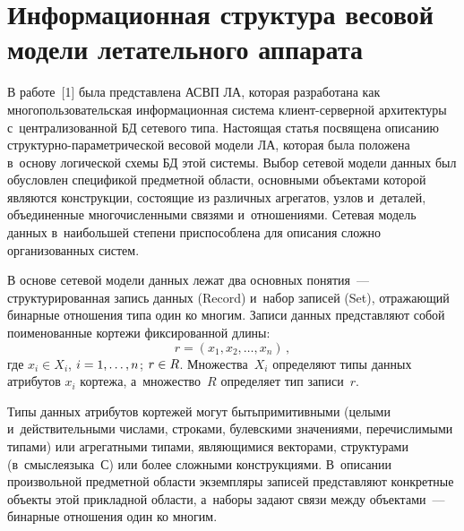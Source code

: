 \begin{multicols}{2}

\label{st\stat}

\section{Информационная структура весовой модели летательного 
аппарата}

  В работе~[1] была представлена АСВП ЛА, которая разработана как 
многопользовательская информационная система кли\-ент-сер\-вер\-ной 
архитектуры с~централизованной БД сетевого типа. \mbox{Настоящая} 
статья посвящена описанию струк\-тур\-но-па\-ра\-мет\-ри\-че\-ской весовой 
модели ЛА, которая была положена в~основу логической 
схемы БД этой сис\-те\-мы. Выбор сетевой модели данных был 
обуслов\-лен спецификой предметной об\-ласти, основными объектами которой 
являются конструкции, состоящие из различных агрегатов, узлов и~деталей, 
объединенные многочисленными связями и~отношениями. Сетевая модель 
данных в~наибольшей степени приспособлена для описания слож\-но 
организованных сис\-тем. 
  
  В основе сетевой модели данных лежат два основных понятия~--- 
структурированная запись данных (Record) и~набор записей (Set), отра\-жа\-ющий 
бинарные отношения типа один ко многим. Записи данных представляют собой 
поименованные кортежи фиксированной длины:
  $$
  r=\left( x_1, x_2,\ldots , x_n\right)\,,
  $$
  где $x_i\in X_i$, $i\hm=1,\ldots , n$; $r\hm\in R$.
  Множества~$X_i$ определяют типы данных атрибутов $x_i$ кортежа, 
а~множество~$R$ определяет тип записи~$r$. 

Типы данных атрибутов кортежей 
могут быть\linebreak примитивными (целыми и~действительными чис\-ла\-ми, строками, 
булевскими значениями, пе\-ре\-чис\-ли\-мы\-ми типами) или агрегатными типами, 
являющимися векторами, структурами (в~смыс\-ле\linebreak \mbox{языка}~С) или более 
сложными конструкциями. В~описании произвольной предметной об\-ласти 
экземпляры записей представляют конкретные объекты этой прикладной 
об\-ласти, а~наборы задают связи между объектами~--- бинарные отношения 
один ко многим. 

  \begin{figure*} %
  \vspace*{1pt}
  \begin{center}
    \mbox{%
 \epsfxsize=128.091mm 
 }
\end{center}
\vspace*{-3pt}
\vspace*{2pt}
  \end{figure*}


\end{multicols}
